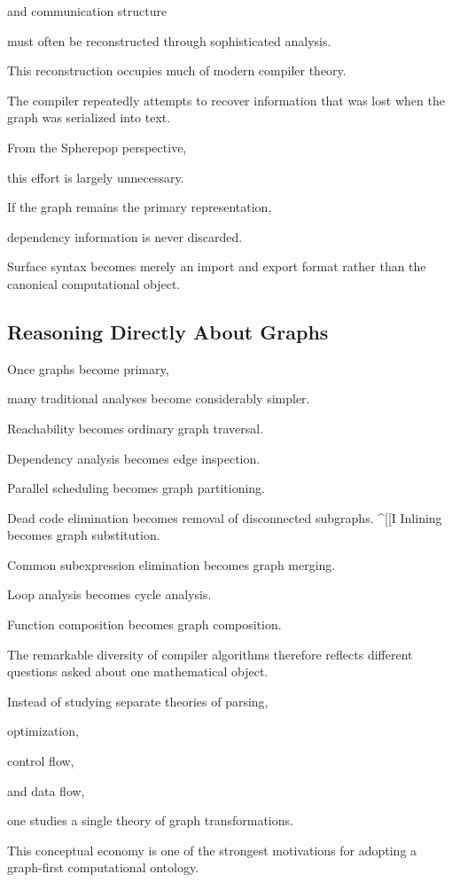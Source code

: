\documentclass[12pt,oneside]{article}
\begin{document}
and communication structure

must often be reconstructed through sophisticated analysis.

This reconstruction occupies much of modern compiler theory.

The compiler repeatedly attempts to recover information that was lost when the graph was serialized into text.

From the Spherepop perspective,

this effort is largely unnecessary.

If the graph remains the primary representation,

dependency information is never discarded.

Surface syntax becomes merely an import and export format rather than the canonical computational object.

\subsection{Reasoning Directly About Graphs}

Once graphs become primary,

many traditional analyses become considerably simpler.

Reachability becomes ordinary graph traversal.

Dependency analysis becomes edge inspection.

Parallel scheduling becomes graph partitioning.

Dead code elimination becomes removal of disconnected subgraphs.
^[[I
Inlining becomes graph substitution.

Common subexpression elimination becomes graph merging.

Loop analysis becomes cycle analysis.

Function composition becomes graph composition.

The remarkable diversity of compiler algorithms therefore reflects different questions asked about one mathematical object.

Instead of studying separate theories of parsing,

optimization,

control flow,

and data flow,

one studies a single theory of graph transformations.

This conceptual economy is one of the strongest motivations for adopting a graph-first computational ontology.
\end{document}
